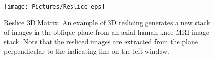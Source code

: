 \documentclass{article}%
\begin{document}
\begin{enumerate}
		\begin{figure}[htbp]
		\centering
			\texttt{[image: Pictures/Reslice.eps]}
		\caption{Reslice 3D Matrix. An example of 3D reslicing generates a new stack of images in the oblique plane from an axial human knee MRI image stack. Note that the resliced images are extracted from the plane perpendicular to the indicating line on the left window.}
		\label{fig:Reslice}
	\end{figure}	
	
\end{enumerate}
	
\end{document}

